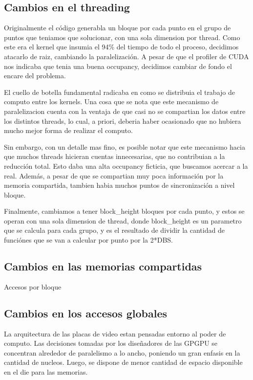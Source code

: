 \subsection{Cambios en el threading}
Originalmente el c\'odigo generabla un bloque por cada punto en el grupo de puntos
que teniamos que solucionar, con una sola dimension por thread.
Como este era el kernel que insumia el 94\% del tiempo de todo el proceso, decidimos
atacarlo de raiz, cambiando la paralelizaci\'on. A pesar de que el profiler de CUDA nos indicaba
que tenia una buena occupancy, decidimos cambiar de fondo el encare del problema.

El cuello de botella fundamental radicaba en como se distribuia el trabajo de computo
entre los kernels. Una cosa que se nota que este mecanismo de paralelizacion cuenta con
la ventaja de que casi no se compartian los datos entre los distintos threads, lo cual,
a priori, deberia haber ocasionado que no hubiera mucho mejor forma de realizar el computo.

Sin embargo, con un detalle mas fino, es posible notar que este mecanismo hacia que
muchos threads hicieran cuentas innecesarias, que no contribuian a la reducci\'on total.
Esto daba una alta occupancy ficticia, que buscamos acercar a la real. Adem\'as, a pesar
de que se compartian muy poca informaci\'on por la memoria compartida, tambien habia muchos
puntos de sincronización a nivel bloque.

Finalmente, cambiamos a tener block\_height bloques por cada punto, y estos se operan
con una sola dimension de thread, donde block\_height es un parametro que se calcula
para cada grupo, y es el resultado de dividir la cantidad de funci\'ones que se van
a calcular por punto por la 2*DBS.


\subsection{Cambios en las memorias compartidas}
Accesos por bloque

\subsection{Cambios en los accesos globales}
La arquitectura de las placas de video estan pensadas entorno al poder de computo.
Las decisiones tomadas por los diseñadores de las GPGPU se concentran alrededor
de paralelismo a lo ancho, poniendo un gran enfasis en la cantidad de nucleos. Luego,
se dispone de menor cantidad de espacio disponible en el die para las memorias.

